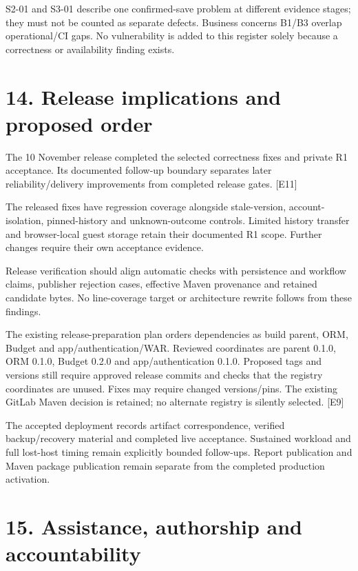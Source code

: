 \documentclass[11pt,a4paper]{article}
\begin{document}
S2-01 and S3-01 describe one confirmed-save problem at different evidence stages; they must not be counted as separate defects. Business concerns B1/\allowbreak{}B3 overlap operational/\allowbreak{}CI gaps. No vulnerability is added to this register solely because a correctness or availability finding exists.

\section*{14. Release implications and proposed order}

The 10 November release completed the selected correctness fixes and private R1 acceptance. Its documented follow-up boundary separates later reliability/\allowbreak{}delivery improvements from completed release gates. [E11]

The released fixes have regression coverage alongside stale-version, account-isolation, pinned-history and unknown-outcome controls. Limited history transfer and browser-local guest storage retain their documented R1 scope. Further changes require their own acceptance evidence.

Release verification should align automatic checks with persistence and workflow claims, publisher rejection cases, effective Maven provenance and retained candidate bytes. No line-coverage target or architecture rewrite follows from these findings.

The existing release-preparation plan orders dependencies as build parent, ORM, Budget and app/\allowbreak{}authentication/\allowbreak{}WAR. Reviewed coordinates are parent 0.1.0, ORM 0.1.0, Budget 0.2.0 and app/\allowbreak{}authentication 0.1.0. Proposed tags and versions still require approved release commits and checks that the registry coordinates are unused. Fixes may require changed versions/\allowbreak{}pins. The existing GitLab Maven decision is retained; no alternate registry is silently selected. [E9]

The accepted deployment records artifact correspondence, verified backup/\allowbreak{}recovery material and completed live acceptance. Sustained workload and full lost-host timing remain explicitly bounded follow-ups. Report publication and Maven package publication remain separate from the completed production activation.

\clearpage
\section*{15. Assistance, authorship and accountability}
\end{document}
